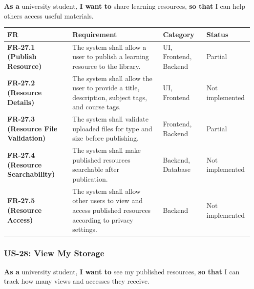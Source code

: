 \documentclass[12pt]{article}
\renewcommand{\baselinestretch}{1.5}
\begin{document}
\textbf{As a} university student, \textbf{I want to} share learning resources, \textbf{so that} I can help others access useful materials.
\par\medskip

\begingroup
\small
\renewcommand{\baselinestretch}{1.0}\selectfont
\renewcommand{\arraystretch}{1.15}
\setlength{\tabcolsep}{6pt}
\begin{longtable}{|>{\raggedright\arraybackslash}p{}|>{\raggedright\arraybackslash}p{}|>{\raggedright\arraybackslash}p{}|>{\raggedright\arraybackslash}p{}|}
\hline
\textbf{FR} & \textbf{Requirement} & \textbf{Category} & \textbf{Status} \\ \hline
\endhead
\textbf{FR-27.1 (Publish Resource)} & The system shall allow a user to publish a learning resource to the library. & UI, Frontend, Backend & Partial \\ \hline
\textbf{FR-27.2 (Resource Details)} & The system shall allow the user to provide a title, description, subject tags, and course tags. & UI, Frontend & Not implemented \\ \hline
\textbf{FR-27.3 (Resource File Validation)} & The system shall validate uploaded files for type and size before publishing. & Frontend, Backend & Partial \\ \hline
\textbf{FR-27.4 (Resource Searchability)} & The system shall make published resources searchable after publication. & Backend, Database & Not implemented \\ \hline
\textbf{FR-27.5 (Resource Access)} & The system shall allow other users to view and access published resources according to privacy settings. & Backend & Not implemented \\ \hline
\end{longtable}
\endgroup
\par\medskip

\hypertarget{sec:us-28-view-my-storage}{}
\subsubsection*{US-28: View My Storage}
\par\medskip

\textbf{As a} university student, \textbf{I want to} see my published resources, \textbf{so that} I can track how many views and accesses they receive.
\par\medskip
\end{document}

